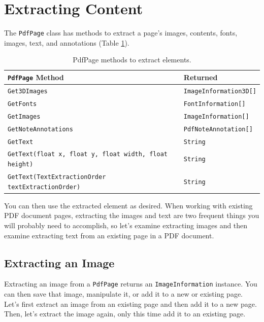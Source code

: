 \documentclass[american]{tufte-book}
\providecommand{\tabularnewline}{\\}
\numberwithin{equation}{section}
\numberwithin{figure}{section}
\begin{document}
{{\section{Extracting Content}

The \texttt{PdfPage} class has methods to extract a page's images,
contents, fonts, images, text, and annotations (Table \ref{tab:PdfPage-methods-to}).

\begin{table}
\begin{tabular}{>{\raggedright}p{}>{\raggedright}p{}}
\toprule 
{\footnotesize\texttt{PdfPage}}{\footnotesize{} Method} & {\footnotesize Returned}\tabularnewline
\midrule
{\footnotesize\texttt{Get3DImages}} & {\footnotesize\texttt{ImageInformation3D{[}{]}}}\tabularnewline
{\footnotesize\texttt{GetFonts}} & {\footnotesize\texttt{FontInformation{[}{]}}}\tabularnewline
{\footnotesize\texttt{GetImages}} & {\footnotesize\texttt{ImageInformation{[}{]}}}\tabularnewline
{\footnotesize\texttt{GetNoteAnnotations}} & {\footnotesize\texttt{PdfNoteAnnotation{[}{]}}}\tabularnewline
{\footnotesize\texttt{GetText}} & {\footnotesize\texttt{String}}\tabularnewline
{\footnotesize\texttt{GetText(float x, float y, float width, float
height)}} & {\footnotesize\texttt{String}}\tabularnewline
{\footnotesize\texttt{GetText(TextExtractionOrder textExtractionOrder)}} & {\footnotesize\texttt{String}}\tabularnewline
\bottomrule
\end{tabular}\caption{PdfPage methods to extract elements.}\label{tab:PdfPage-methods-to}
\end{table}
You can then use the extracted element as desired.  When working with
existing PDF document pages, extracting the images and text are two
frequent things you will probably need to accomplish, so let's examine
extracting images and then examine extracting text from an existing
page in a PDF document.

\subsection{Extracting an Image}

Extracting an image from a \texttt{PdfPage} returns an \texttt{ImageInformation} instance. You can then save that image, manipulate
it, or add it to a new or existing page. Let's first extract an image
from an existing page and then add it to a new page. Then, let's extract
the image again, only this time add it to an existing page.

}}
\end{document}
